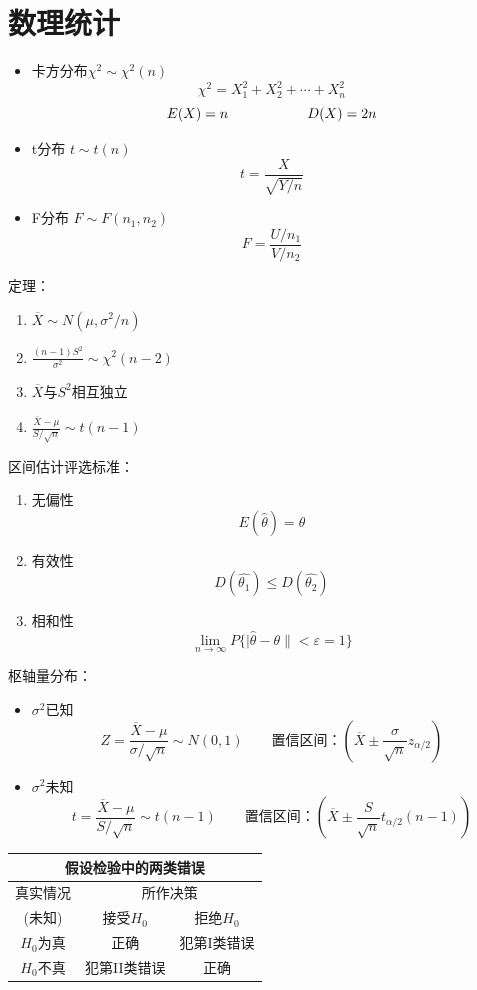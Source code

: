 \documentclass{article}
\begin{document}
\section*{\center\Huge 数理统计}
\begin{tcolorbox}
    [colback=greenshade,colframe=Green!50!black,title=\textbf{基本概念}]
\begin{itemize}
    \item 卡方分布$\chi ^2 \sim \chi ^2(n)$
    \[\chi ^2=X_1^2+X_2^2+\cdots +X_n^2\]
    \[E(X)=n \hspace*{2cm} D(X)=2n\]
    \item t分布 $t\sim t(n)$
    \[t=\frac{X}{\sqrt{Y/n}}\]
    \item F分布 $F\sim F(n_1,n_2)$
    \[F=\frac{U/n_1}{V/n_2}\]
\end{itemize}
定理：
\begin{enumerate}
    \item $\overline{X} \sim N(\mu ,\sigma^2/n)$
    \item $\frac{(n-1)S^2}{\sigma ^2}\sim \chi ^2(n-2)$
    \item $\overline{X}$与$S^2$相互独立
    \item $\frac{\overline{X}-\mu }{S/\sqrt{n}}\sim t(n-1)$
\end{enumerate}
区间估计评选标准：
\begin{enumerate}
    \item 无偏性
    \[E(\hat{\theta})=\theta \]
    \item 有效性
    \[D(\hat{\theta _1})\leq D(\hat{\theta _2})\]
    \item 相和性
    \[ \lim_{n\to \infty}P\{|\hat{\theta}-\theta\|< \varepsilon = 1 \}  \]
\end{enumerate}
枢轴量分布：
\begin{itemize}
    \item $\sigma^2$已知
    \[Z=\frac{\overline{X}-\mu}{\sigma /\sqrt{n}} \sim N(0,1)\qquad\text{置信区间：}(\overline{X} \pm \frac{\sigma}{\sqrt{n}}z_{\alpha/2})\]
    \item $\sigma^2$未知
    \[t=\frac{\overline{X}-\mu}{S /\sqrt{n}} \sim t(n-1)\qquad\text{置信区间：}(\overline{X} \pm \frac{S}{\sqrt{n}}t_{\alpha/2}(n-1))\]
\end{itemize}

\begin{tabular}{c|c|c}
    \hline
    \multicolumn{3}{c}{假设检验中的两类错误}\\ \hline
    真实情况&\multicolumn{2}{c}{所作决策} \\  \cline{2-3}
    (未知)&接受$H_0$&拒绝$H_0$ \\ \hline
    $H_0$为真&正确&犯第I类错误\\ \hline
    $H_0$不真&犯第II类错误&正确\\ \hline
\end{tabular}
\end{tcolorbox}
\clearpage
\end{document}
